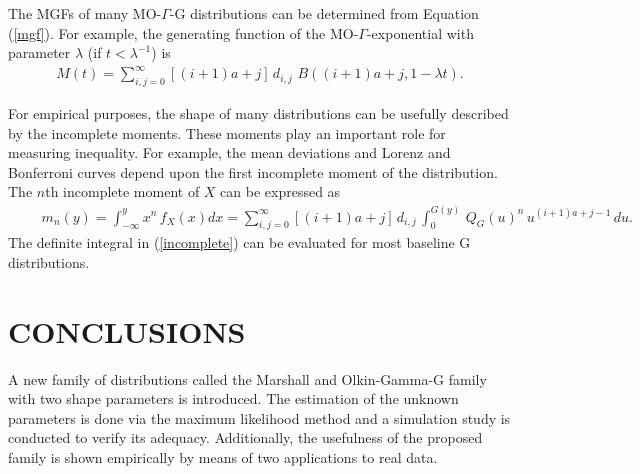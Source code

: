 \documentclass[twoside,leqno,11pt]{article}
\begin{document}
The MGFs of many MO-$\Gamma$-G distributions can be determined from Equation (\ref{mgf}).
For example, the generating function of the MO-$\Gamma$-exponential with parameter $\lambda$
(if $t<\lambda^{-1}$) is
\begin{eqnarray*}
\displaystyle
M(t)=\sum_{i,j=0}^{\infty} [(i+1)a+j]\,d_{i,j}\,\,B((i+1)a+j,1-\lambda t).
\end{eqnarray*}

For empirical purposes, the shape of many distributions can be usefully described by
the incomplete moments. These moments play an important role for measuring
inequa\-lity. For example, the mean deviations and Lorenz and Bonferroni curves depend upon the first incomplete moment of the distribution.
The $n$th incomplete moment of $X$ can be expressed as
{\small
\begin{eqnarray}\label{incomplete}
\displaystyle
\qquad
m_{n}(y)=\int_{-\infty}^y x^n\,f_{X}(x) dx = \sum_{i,j=0}^{\infty} [(i+1)a+j]\,d_{i,j}\,\int_{0}^{G(y)}\,Q_G(u)^n\, u^{(i+1)a+j-1}\,du.
\end{eqnarray}
}
The definite integral in (\ref{incomplete}) can be evaluated for most baseline G distributions.


\section{CONCLUSIONS}\label{conclusions}

A new family of distributions called the Marshall and Olkin-Gamma-G family with two shape parameters is introduced. The estimation of the unknown
parameters is done via the maximum likelihood method and a simulation study is conducted to verify its adequacy. Additionally, the usefulness
of the proposed family is shown empirically by means of two applications to real data.
\end{document}
